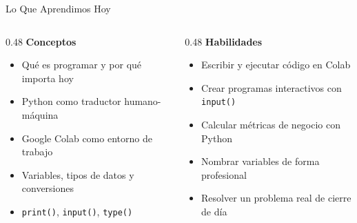 \documentclass[aspectratio=169, 11pt]{beamer}
\begin{document}
\begin{frame}{Lo Que Aprendimos Hoy}
  \vspace{-6pt}
  \begin{columns}[T]
    \begin{column}{0.48\textwidth}
      {\footnotesize\color{arcaDark}\bfseries Conceptos}

      \vspace{4pt}
      {\footnotesize\color{textMuted}
      \begin{itemize}\setlength{\itemsep}{3pt}
        \item[{\color{codeGreen}\scriptsize\faCheck}]
          Qué es programar y por qué importa hoy
        \item[{\color{codeGreen}\scriptsize\faCheck}]
          Python como traductor humano-máquina
        \item[{\color{codeGreen}\scriptsize\faCheck}]
          Google Colab como entorno de trabajo
        \item[{\color{codeGreen}\scriptsize\faCheck}]
          Variables, tipos de datos y conversiones
        \item[{\color{codeGreen}\scriptsize\faCheck}]
          \texttt{print()}, \texttt{input()}, \texttt{type()}
      \end{itemize}
      }
    \end{column}

    \begin{column}{0.48\textwidth}
      {\footnotesize\color{arcaDark}\bfseries Habilidades}

      \vspace{4pt}
      {\footnotesize\color{textMuted}
      \begin{itemize}\setlength{\itemsep}{3pt}
        \item[{\color{codeGreen}\scriptsize\faCheck}]
          Escribir y ejecutar código en Colab
        \item[{\color{codeGreen}\scriptsize\faCheck}]
          Crear programas interactivos con \texttt{input()}
        \item[{\color{codeGreen}\scriptsize\faCheck}]
          Calcular métricas de negocio con Python
        \item[{\color{codeGreen}\scriptsize\faCheck}]
          Nombrar variables de forma profesional
        \item[{\color{codeGreen}\scriptsize\faCheck}]
          Resolver un problema real de cierre de día
      \end{itemize}
      }
    \end{column}
  \end{columns}
\end{frame}
\end{document}
